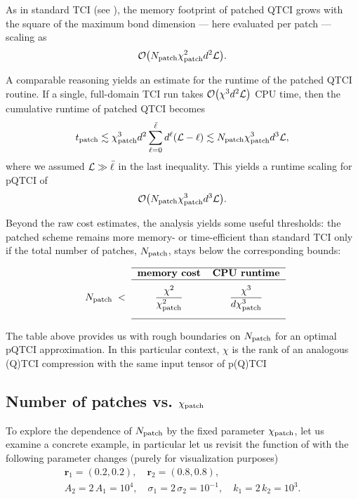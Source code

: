 As in standard TCI (see ), the memory footprint of patched QTCI grows with the square of the maximum bond dimension — here evaluated per patch — scaling as  
\begin{equation}
	\mathcal{O}\bigl(N_{\text{patch}} \chi_{\text{patch}}^2 d^2 \mathcal{L}\bigr). 
	\label{eq:PatchMemoryScaling}
\end{equation}

A comparable reasoning yields an estimate for the runtime  of the patched QTCI routine. If a single, full-domain TCI run takes  $\mathcal{O}\bigl( \chi^3 d^2 \mathcal{L} \bigr)$ CPU time, then the cumulative runtime of patched QTCI becomes
\begin{equation}
	t_{\text{patch}} \lesssim \chi_{\text{patch}}^3 d^2 \sum_{\ell = 0}^{{\bar \ell}} d^\ell (\mathcal{L} - \ell) \lesssim  N_{\text{patch}} \chi_{\text{patch}}^3 d^3 \mathcal{L},
\end{equation}
where we assumed $\mathcal{L} \gg {\bar \ell}$ in the last inequality. This yields a runtime scaling for pQTCI of 
\begin{equation}
	\mathcal{O}\bigl(N_{\text{patch}} \chi_{\text{patch}}^3 d^3 \mathcal{L}\bigr).
	\label{eq:PatchTimeScaling}
\end{equation}

Beyond the raw cost estimates, the analysis yields some useful thresholds: the patched scheme remains more memory- or time-efficient than standard TCI only if the total number of patches, $N_{\text{patch}}$, stays below the corresponding bounds:

\begin{equation}
  \begin{tabular}{ccc}
    \cline{2-3}
      & \textbf{memory cost} & \textbf{CPU runtime} \\ \cline{2-3} \\[-6pt]
    $\Np\;<$ &
      $\displaystyle \frac{\chi^{2}}{\chi_{\text{patch}}^{2}}$ &
      $\displaystyle \frac{\chi^{3}}{d\chi_{\text{patch}}^{3}}$ \\[15pt]\cline{2-3}
  \end{tabular}
  \label{eq:chiPatchBound}
\end{equation}

The table above provides us with rough boundaries on $N_{\text{patch}}$ for an optimal pQTCI approximation. In this particular context, $\chi$ is the rank of an analogous (Q)TCI compression with the same input tensor of p(Q)TCI

\subsection{Number of patches vs. $\chi_{\text{patch}}$}
To explore the dependence of $N_{\text{patch}}$ by the fixed parameter $\chi_{\text{patch}}$, let us examine a concrete example, in particular let us revisit the function of  with the following parameter changes (purely for visualization purposes)
\begin{equation}
	\label{eq:localFuncNewParams}
\begin{gathered}
	\boldsymbol{r}_{1} = ( 0.2, 0.2), \quad \boldsymbol{r}_{2} = ( 0.8, 0.8),\\[6pt]
	A_2 = 2\, A_1 = 10^4, \quad \sigma_1 = 2\, \sigma_2 = 10^{-1}, \quad k_1 = 2\, k_2 = 10^3. 	
\end{gathered}
\end{equation}

